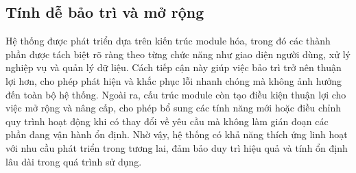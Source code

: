 \documentclass[../DoAn.tex]{subfiles}
\begin{document}
\subsection{Tính dễ bảo trì và mở rộng}
Hệ thống được phát triển dựa trên kiến trúc module hóa, trong đó các thành phần được tách biệt rõ ràng theo từng chức năng như giao diện người dùng, xử lý nghiệp vụ và quản lý dữ liệu. Cách tiếp cận này giúp việc bảo trì trở nên thuận lợi hơn, cho phép phát hiện và khắc phục lỗi nhanh chóng mà không ảnh hưởng đến toàn bộ hệ thống. Ngoài ra, cấu trúc module còn tạo điều kiện thuận lợi cho việc mở rộng và nâng cấp, cho phép bổ sung các tính năng mới hoặc điều chỉnh quy trình hoạt động khi có thay đổi về yêu cầu mà không làm gián đoạn các phần đang vận hành ổn định. Nhờ vậy, hệ thống có khả năng thích ứng linh hoạt với nhu cầu phát triển trong tương lai, đảm bảo duy trì hiệu quả và tính ổn định lâu dài trong quá trình sử dụng.



\end{document}
